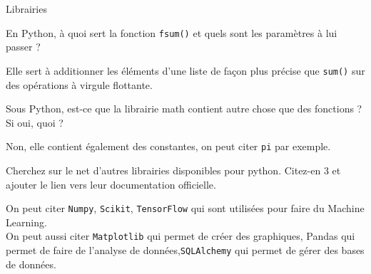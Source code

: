 \begin{section}{Librairies}
\begin{solution}
    
\end{solution} 
\begin{Exercice}[5 minutes]
	En Python, à quoi sert la fonction \lstinline{fsum()} et quels sont les paramètres à lui passer ? 
\end{Exercice}
\begin{solution}
	Elle sert à additionner les éléments d'une liste de façon plus précise que \lstinline{sum()} sur des opérations à virgule flottante.
\end{solution} 
\begin{comment}
    \begin{Exercice}[5 minutes]
        Comment faire si je veux calculer la distance euclidienne entre 2 points ? 
    \end{Exercice} \\
    \begin{solution}
        Il faut utiliser la fonction dist(p,q). Attention, ici p et q sont les deux des listes de coordonnées !
    \end{solution} 
\end{comment}
\begin{Exercice}[5 minutes]
	Sous Python, est-ce que la librairie math contient autre chose que des fonctions ? Si oui, quoi ? 
\end{Exercice} 
\begin{solution}
	Non, elle contient également des constantes, on peut citer \lstinline{pi} par exemple.
\end{solution} 
\begin{Exercice}[10 minutes]
	Cherchez sur le net d'autres librairies disponibles pour python. Citez-en 3 et ajouter le lien vers leur documentation officielle.
\end{Exercice}    
\begin{solution}
	On peut citer \lstinline{Numpy}, \lstinline{Scikit}, \lstinline{TensorFlow} qui sont utilisées pour faire du Machine Learning. \\
	
	On peut aussi citer \lstinline{Matplotlib} qui permet de créer des graphiques, Pandas qui permet de faire de l'analyse de données,\lstinline{SQLAlchemy} qui permet de gérer des bases de données. \\
\end{solution} 
\end{section}

